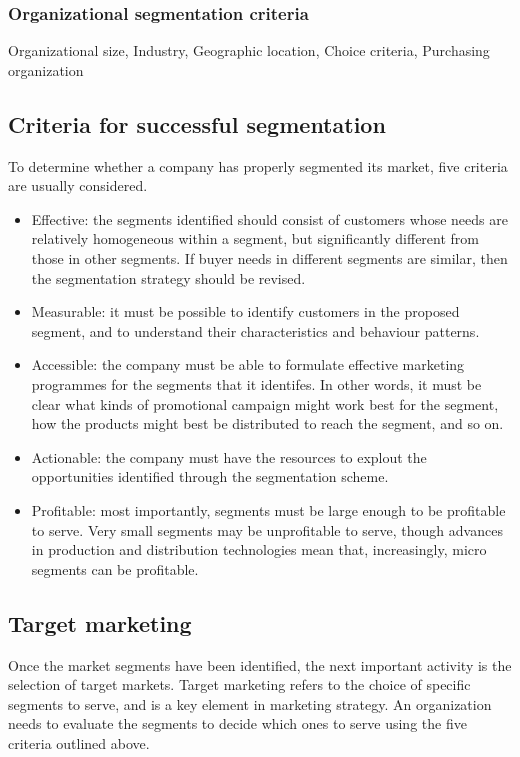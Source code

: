 \documentclass{article}
\begin{document}
\subsubsection*{Organizational segmentation criteria}
Organizational size, Industry, Geographic location, Choice criteria, Purchasing organization

\subsection{Criteria for successful segmentation}
To determine whether a company has properly segmented its market, five criteria are usually considered.

\begin{itemize}
    \item Effective: the segments identified should consist of customers whose needs are relatively homogeneous within a segment, but significantly different from those in other segments. If buyer needs in different segments are similar, then the segmentation strategy should be revised.
    
    \item Measurable: it must be possible to identify customers in the proposed segment, and to understand their characteristics and behaviour patterns.
    
    \item Accessible: the company must be able to formulate effective marketing programmes for the segments that it identifes. In other words, it must be clear what kinds of promotional campaign might work best for the segment, how the products might best be distributed to reach the segment, and so on.
    
    \item Actionable: the company must have the resources to explout the opportunities identified through the segmentation scheme.
    
    \item Profitable: most importantly, segments must be large enough to be profitable to serve. Very small segments may be unprofitable to serve, though advances in production and distribution technologies mean that, increasingly, micro segments can be profitable. 
\end{itemize}

\subsection{Target marketing}
Once the market segments have been identified, the next important activity is the selection of target markets. Target marketing refers to the choice of specific segments to serve, and is a key element in marketing strategy. An organization needs to evaluate the segments to decide which ones to serve using the five criteria outlined above.
\end{document}
